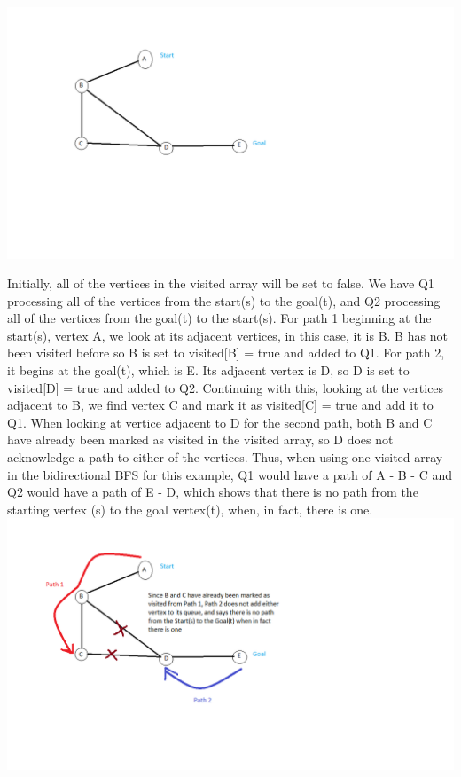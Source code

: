 \documentclass[12pt]{article}
\begin{document}
\begin{enumerate}
\begin{enumerate}
	\includegraphics[scale = 0.7]{visitedarrayexample.png}
	
	Initially, all of the vertices in the visited array will be set to false. We have Q1 processing all of the vertices from the start(s) to the goal(t), and Q2 processing all of the vertices from the goal(t) to the start(s). For path 1 beginning at the start(s), vertex A, we look at its adjacent vertices, in this case, it is B. B has not been visited before so B is set to visited[B] = true and added to Q1. For path 2, it begins at the goal(t), which is E. Its adjacent vertex is D, so D is set to visited[D] = true and added to Q2. Continuing with this, looking at the vertices adjacent to B, we find vertex C and mark it as visited[C] = true and add it to Q1. When looking at vertice adjacent to D for the second path, both B and C have already been marked as visited in the visited array, so D does not acknowledge a path to either of the vertices. Thus, when using one visited array in the bidirectional BFS for this example, Q1 would have a path of A - B - C and Q2 would have a path of E - D, which shows that there is no path from the starting vertex (s) to the goal vertex(t), when, in fact, there is one. 
\includegraphics[scale = 0.7]{visitedarrayexample2.png}
	

\end{enumerate}
\end{enumerate}
\end{document}
